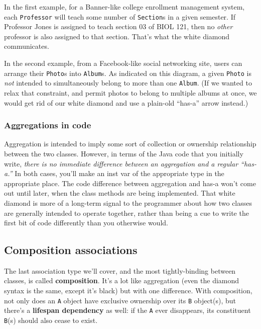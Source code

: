 In the first example, for a Banner-like college enrollment management system,
each \texttt{Professor} will teach some number of \texttt{Section}s in a given
semester. If Professor Jones is assigned to teach section 03 of BIOL 121, then
no \textit{other} professor is also assigned to that section. That's what the
white diamond communicates.

In the second example, from a Facebook-like social networking site, users can
arrange their \texttt{Photo}s into \texttt{Album}s. As indicated on this
diagram, a given \texttt{Photo} is \textit{not} intended to simultaneously
belong to more than one \texttt{Album}. (If we wanted to relax that
constraint, and permit photos to belong to multiple albums at once, we would
get rid of our white diamond and use a plain-old ``has-a'' arrow instead.)

\subsubsection{Aggregations in code}

Aggregation is intended to imply some sort of collection or ownership
relationship between the two classes. However, in terms of the Java code that
you initially write, \textit{there is no immediate difference between an
aggregation and a regular ``has-a.''} In both cases, you'll make an inst var of
the appropriate type in the appropriate place. The code difference between
aggregation and has-a won't come out until later, when the class methods are
being implemented. That white diamond is more of a long-term signal to the
programmer about how two classes are generally intended to operate together,
rather than being a cue to write the first bit of code differently than you
otherwise would.

\subsection{Composition associations}

The last association type we'll cover, and the most tightly-binding between
classes, is called \textbf{composition}. It's a lot like aggregation (even the
diamond syntax is the same, except it's black) but with one difference. With
composition, not only does an \texttt{A} object have exclusive ownership over
its \texttt{B} object(s), but there's a \textbf{lifespan dependency} as well:
if the \texttt{A} ever disappears, its constituent \texttt{B}(s) should also
cease to exist.

